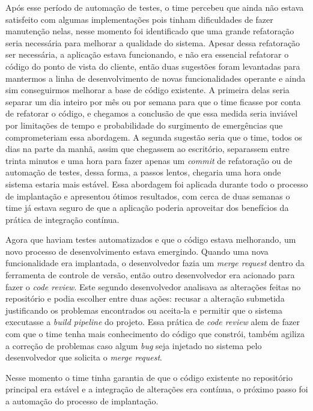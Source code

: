 \documentclass[
12pt,				%
openright,			%
oneside,			%
a4paper,			%
english,			%
french,				%
spanish,			%
brazil,				%
]{abntex2}
\begin{document}
Após esse período de automação de testes, o time percebeu que ainda não estava satisfeito com algumas implementações pois tinham dificuldades de fazer manutenção nelas, nesse momento foi identificado que uma grande refatoração seria necessária para melhorar a qualidade do sistema. Apesar dessa refatoração ser necessária, a aplicação estava funcionando, e não era essencial refatorar o código do ponto de vista do cliente, então duas sugestões foram levantadas para mantermos a linha de desenvolvimento de novas funcionalidades operante e ainda sim conseguirmos melhorar a base de código existente. A primeira delas seria separar um dia inteiro por mês ou por semana para que o time ficasse por conta de refatorar o código, e chegamos a conclusão de que essa medida seria inviável por limitações de tempo e probabilidade do surgimento de emergências que comprometeriam essa abordagem. A segunda sugestão seria que o time, todos os dias na parte da manhã, assim que chegassem ao escritório, separassem entre trinta minutos e uma hora para fazer apenas um \textit{commit} de refatoração ou de automação de testes, dessa forma, a passos lentos, chegaria uma hora onde sistema estaria mais estável. Essa abordagem foi aplicada durante todo o processo de implantação e apresentou ótimos resultados, com cerca de duas semanas o time já estava seguro de que a aplicação poderia aproveitar dos benefícios da prática de integração contínua.

Agora que haviam testes automatizados e que o código estava melhorando, um novo processo de desenvolvimento estava emergindo. Quando uma nova funcionalidade era implantada, o desenvolvedor fazia um \textit{merge request} dentro da ferramenta de controle de versão, então outro desenvolvedor era acionado para fazer o \textit{code review}. Este segundo desenvolvedor analisava as alterações feitas no repositório e podia escolher entre duas ações: recusar a alteração submetida justificando os problemas encontrados ou aceita-la e permitir que o sistema executasse a \textit{build pipeline} do projeto. Essa prática de \textit{code review} alem de fazer com que o time tenha mais conhecimento do código que constrói, também agiliza a correção de problemas caso algum \textit{bug} seja injetado no sistema pelo desenvolvedor que solicita o \textit{merge request}.

Nesse momento o time tinha garantia de que o código existente no repositório principal era estável e a integração de alterações era contínua, o próximo passo foi a automação do processo de implantação.
\end{document}
